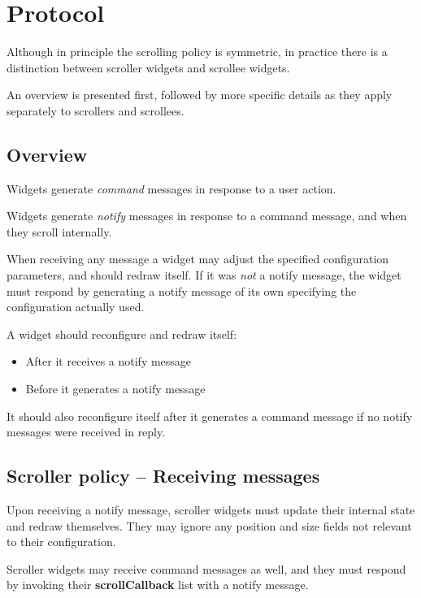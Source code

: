 \section{Protocol}

Although in principle the scrolling policy is symmetric, in practice
there is a distinction between scroller widgets and scrollee widgets.

An overview is presented first, followed by more specific details as
they apply separately to scrollers and scrollees.

\subsection{Overview}

Widgets generate {\it command}\/ messages in response to a user action.

Widgets generate {\it notify}\/ messages in response to a command message,
and when they scroll internally.

When receiving any message a widget may adjust the specified configuration
parameters, and should redraw itself.  If it was {\it not}\/ a
notify message, the widget must respond by generating a notify message
of its own specifying the configuration actually used.

A widget should reconfigure and redraw itself:

\begin{itemize}

\item
After it receives a notify message

\item
Before it generates a notify message

\end{itemize}

It should also reconfigure itself after it generates a command message
if no notify messages were received in reply.


\subsection{Scroller policy -- Receiving messages}

Upon receiving a notify message, scroller widgets must update their
internal state and redraw themselves.  They may ignore any position
and size fields not relevant to their configuration.

Scroller widgets may receive command messages as well, and they must
respond by invoking their {\bf scrollCallback} list with a notify message.


